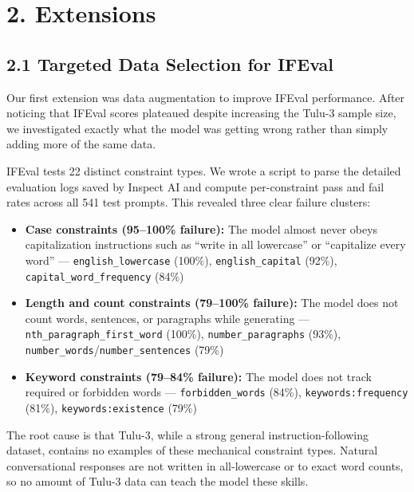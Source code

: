 \documentclass[10pt,letterpaper]{article}
\begin{document}
\section{2. Extensions}

\subsection{2.1 Targeted Data Selection for IFEval}

Our first extension was  data augmentation to improve IFEval performance. After 
noticing that IFEval scores plateaued despite increasing the Tulu-3 sample size, we 
investigated exactly what the model was getting wrong rather than simply adding more 
of the same data.

IFEval tests 22 distinct constraint types. We wrote a script to parse the detailed 
evaluation logs saved by Inspect AI and compute per-constraint pass and fail rates 
across all 541 test prompts. This revealed three clear failure clusters:

\begin{itemize}[noitemsep,topsep=2pt]
\item \textbf{Case constraints (95--100\% failure):} The model almost never obeys 
capitalization instructions such as ``write in all lowercase'' or ``capitalize every 
word'' --- \texttt{english\_lowercase} (100\%), \texttt{english\_capital} (92\%), 
\texttt{capital\_word\_frequency} (84\%)
\item \textbf{Length and count constraints (79--100\% failure):} The model does not 
count words, sentences, or paragraphs while generating --- 
\texttt{nth\_paragraph\_first\_word} (100\%), \texttt{number\_paragraphs} (93\%), 
\texttt{number\_words}/\texttt{number\_sentences} (79\%)
\item \textbf{Keyword constraints (79--84\% failure):} The model does not track 
required or forbidden words --- \texttt{forbidden\_words} (84\%), 
\texttt{keywords:frequency} (81\%), \texttt{keywords:existence} (79\%)
\end{itemize}

The root cause is that Tulu-3, while a strong general instruction-following dataset, 
contains no examples of these mechanical constraint types. Natural conversational 
responses are not written in all-lowercase or to exact word counts, so no amount of 
Tulu-3 data can teach the model these skills.
\end{document}
